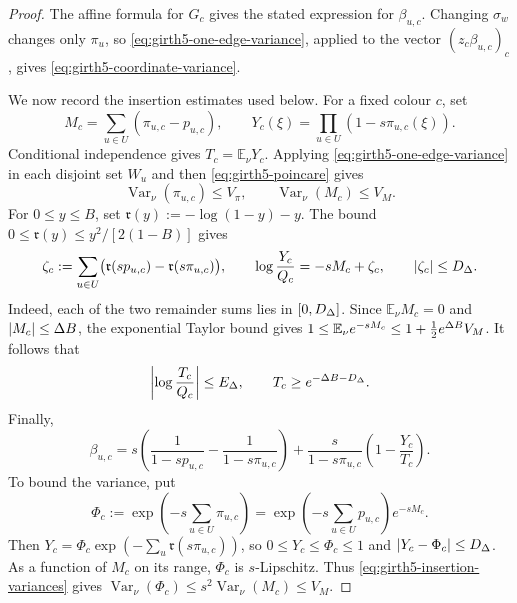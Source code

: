 \begin{proof}
The affine formula for $G_c$ gives the stated expression for $\beta_{u,c}$.
Changing $\sigma_w$ changes only $\pi_u$, so \eqref{eq:girth5-one-edge-variance}, applied to the vector
$(z_c\beta_{u,c})_c$, gives \eqref{eq:girth5-coordinate-variance}.

We now record the insertion estimates used below.  For a fixed colour $c$, set
\begin{equation}\label{eq:girth5-insertion-variables}
 M_c=\sum_{u\in U}(\pi_{u,c}-p_{u,c}),\qquad
 Y_c(\xi)=\prod_{u\in U}(1-s\pi_{u,c}(\xi)).
\end{equation}
Conditional independence gives $T_c=\mathbb E_\nu Y_c$.  Applying
\eqref{eq:girth5-one-edge-variance} in each disjoint set $W_u$ and then \eqref{eq:girth5-poincare} gives
\begin{equation}\label{eq:girth5-insertion-variances}
 \operatorname{Var}_\nu(\pi_{u,c})\le V_\pi,\qquad
 \operatorname{Var}_\nu(M_c)\le V_M.
\end{equation}
For $0\le y\le B$, set $\mathfrak r(y):=-\log(1-y)-y$.
The bound $0\le\mathfrak r(y)\le y^2/[2(1-B)]$ gives
\begin{equation}\label{eq:girth5-log-remainder}
 \zeta_c:=\sum_{u\in U}
   \bigl(\mathfrak r(sp_{u,c})-\mathfrak r(s\pi_{u,c})\bigr),
 \qquad
 \log\frac{Y_c}{Q_c}=-sM_c+\zeta_c,
 \qquad |\zeta_c|\le D_\Delta.
\end{equation}
Indeed, each of the two remainder sums lies in $[0,D_\Delta]$.
Since $\mathbb E_\nu M_c=0$ and $|M_c|\le\Delta B$, the exponential
Taylor bound gives
$1\le\mathbb E_\nu e^{-sM_c}\le
1+\tfrac12e^{\Delta B}V_M$.  It follows that
\begin{equation}\label{eq:girth5-insertion-quotient}
 \left|\log\frac{T_c}{Q_c}\right|\le E_\Delta,\qquad
 T_c\ge e^{-\Delta B-D_\Delta}.
\end{equation}
Finally,
\begin{equation}\label{eq:girth5-beta-decomposition}
 \beta_{u,c}=s\left(\frac1{1-sp_{u,c}}-\frac1{1-s\pi_{u,c}}\right)
 +\frac{s}{1-s\pi_{u,c}}\left(1-\frac{Y_c}{T_c}\right).
\end{equation}
To bound the variance, put
\[
 \Phi_c:=\exp\!\left(-s\sum_{u\in U}\pi_{u,c}\right)
 =\exp\!\left(-s\sum_{u\in U}p_{u,c}\right)e^{-sM_c}.
\]
Then $Y_c=\Phi_c\exp(-\sum_u\mathfrak r(s\pi_{u,c}))$, so
$0\le Y_c\le\Phi_c\le1$ and $|Y_c-\Phi_c|\le D_\Delta$.
As a function of $M_c$ on its range, $\Phi_c$ is $s$-Lipschitz.
Thus \eqref{eq:girth5-insertion-variances} gives
$\operatorname{Var}_\nu(\Phi_c)\le s^2\operatorname{Var}_\nu(M_c)\le V_M$.

\end{proof}
